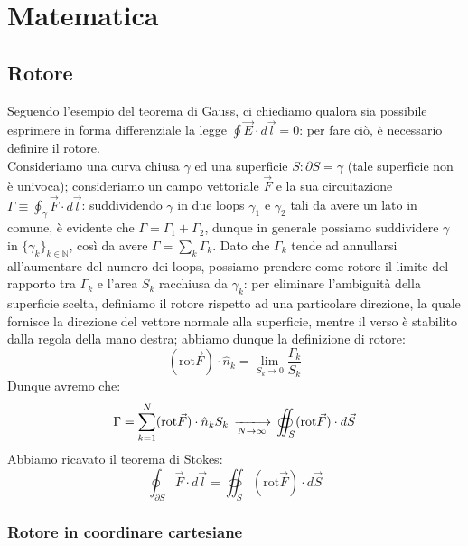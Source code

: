 \documentclass[]{article}
\begin{document}
\section{Matematica}

\subsection{Rotore}

Seguendo l'esempio del teorema di Gauss, ci chiediamo qualora sia possibile esprimere in forma differenziale la legge $ \oint \vec{E} \cdot d\vec{l} = 0 $: per fare ciò, è necessario definire il rotore. \\
%
Consideriamo una curva chiusa $ \gamma $ ed una superficie $ S : \partial S = \gamma $ (tale superficie non è univoca); consideriamo un campo vettoriale $ \vec{F} $ e la sua circuitazione $ \Gamma \equiv \oint_{\gamma} \vec{F} \cdot d\vec{l} $: suddividendo $ \gamma $ in due loops $ \gamma_1 $ e $ \gamma_2 $ tali da avere un lato in comune, è evidente che $ \Gamma = \Gamma_1 + \Gamma_2 $, dunque in generale possiamo suddividere $ \gamma $ in $ \{\gamma_k\}_{k\in\mathbb{N}} $, così da avere $ \Gamma = \sum_{k} \Gamma_k $. Dato che $ \Gamma_k $ tende ad annullarsi all'aumentare del numero dei loops, possiamo prendere come rotore il limite del rapporto tra $ \Gamma_k $ e l'area $ S_k $ racchiusa da $ \gamma_k $: per eliminare l'ambiguità della superficie scelta, definiamo il rotore rispetto ad una particolare direzione, la quale fornisce la direzione del vettore normale alla superficie, mentre il verso è stabilito dalla regola della mano destra; abbiamo dunque la definizione di rotore:
\begin{equation}
	( \text{rot} \vec{F} ) \cdot \hat{n}_k = \lim_{S_k \rightarrow 0} \frac{\Gamma_k}{S_k}
	\label{eq:}
\end{equation}
Dunque avremo che:
\begin{equation}
	\Gamma = \displaystyle\sum_{k = 1}^{N} ( \text{rot} \vec{F} ) \cdot \hat{n}_k S_k \,\xlongrightarrow[N \rightarrow \infty]{}\, \oiint_S ( \text{rot} \vec{F} ) \cdot d\vec{S}
	\label{eq:}
\end{equation}
Abbiamo ricavato il teorema di Stokes:
\begin{equation}
	\oint_{\partial S} \vec{F} \cdot d\vec{l} = \oiint_S ( \text{rot} \vec{F} ) \cdot d\vec{S}
	\label{eq:}
\end{equation}

\subsubsection{Rotore in coordinare cartesiane}
\end{document}
